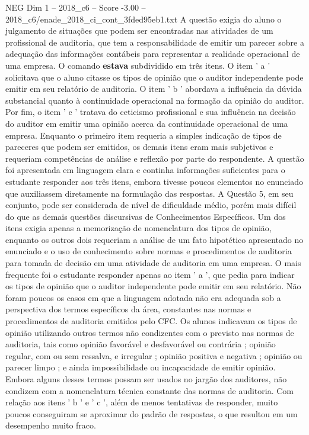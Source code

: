 \begin{textsample}{NEG Dim 1 – 2018\_c6 – Score -3.00 – 2018\_c6/enade\_2018\_ci\_cont\_3fded95eb1.txt}
A questão exigia do aluno o julgamento de situações que podem ser encontradas nas atividades de um profissional de auditoria, que tem a responsabilidade de emitir um parecer sobre a adequação das informações contábeis para representar a realidade operacional de uma empresa.
O comando \textbf{estava} subdividido em três itens.
O item ' a ' solicitava que o aluno citasse os tipos de opinião que o auditor independente pode emitir em seu relatório de auditoria.
O item ' b ' abordava a influência da dúvida substancial quanto à continuidade operacional na formação da opinião do auditor.
Por fim, o item ' c ' tratava do ceticismo profissional e sua influência na decisão do auditor em emitir uma opinião acerca da continuidade operacional de uma empresa.
Enquanto o primeiro item requeria a simples indicação de tipos de pareceres que podem ser emitidos, os demais itens eram mais subjetivos e requeriam competências de análise e reflexão por parte do respondente.
A questão foi apresentada em linguagem clara e continha informações suficientes para o estudante responder aos três itens, embora tivesse poucos elementos no enunciado que auxiliassem diretamente na formulação das respostas.
A Questão 5, em seu conjunto, pode ser considerada de nível de dificuldade médio, porém mais difícil do que as demais questões discursivas de Conhecimentos Específicos.
Um dos itens exigia apenas a memorização de nomenclatura dos tipos de opinião, enquanto os outros dois requeriam a análise de um fato hipotético apresentado no enunciado e o uso de conhecimento sobre normas e procedimentos de auditoria para tomada de decisão em uma atividade de auditoria em uma empresa.
O mais frequente foi o estudante responder apenas ao item ' a ', que pedia para indicar os tipos de opinião que o auditor independente pode emitir em seu relatório.
Não foram poucos os casos em que a linguagem adotada não era adequada sob a perspectiva dos termos específicos da área, constantes nas normas e procedimentos de auditoria emitidos pelo CFC.
Os alunos indicavam os tipos de opinião utilizando outros termos não condizentes com o previsto nas normas de auditoria, tais como opinião favorável e desfavorável ou contrária ; opinião regular, com ou sem ressalva, e irregular ; opinião positiva e negativa ; opinião ou parecer limpo ; e ainda impossibilidade ou incapacidade de emitir opinião.
Embora alguns desses termos possam ser usados no jargão dos auditores, não condizem com a nomenclatura técnica constante das normas de auditoria.
Com relação aos itens ' b ' e ' c ', além de menos tentativas de responder, muito poucos conseguiram se aproximar do padrão de respostas, o que resultou em um desempenho muito fraco.

\end{textsample}
